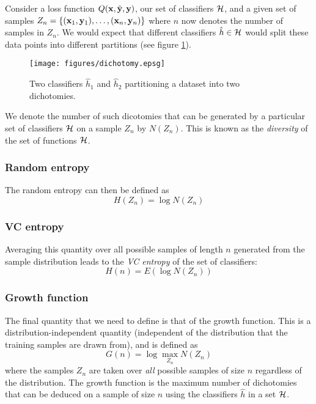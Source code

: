 Consider a loss function $Q(\mathbf{x}, \hat{\mathbf{y}}, \mathbf{y})$, our set of
classifiers $\mathcal{H}$, and a given set of samples $Z_n = \{ (\mathbf{x}_1,
\mathbf{y}_1), \ldots, (\mathbf{x}_n, \mathbf{y}_n) \}$ where $n$ now denotes the number
of samples in $Z_n$.  We would expect that different classifiers
$\hat{h} \in \mathcal{H}$ would split these data points into different
partitions (see figure \ref{fig:dichotomy}).

\begin{figure}
\begin{center}
\texttt{[image: figures/dichotomy.epsg]}
\end{center}
\caption{Two classifiers $\hat{h}_1$ and $\hat{h}_2$ partitioning a
dataset into two dichotomies.}
\label{fig:dichotomy}
\end{figure}

We denote the number of such dicotomies that can be generated by a
particular set of classifiers $\mathcal{H}$ on a sample $Z_n$ by $N(Z_n)$.
This is known as the \emph{diversity} of the set of functions $\mathcal{H}$.

\subsubsection{Random entropy}

The random entropy can then be defined as
%
\begin{equation}
H(Z_n) = \log N(Z_n)
\end{equation}

\subsubsection{VC entropy}

Averaging this quantity over all possible samples of length $n$
generated from the sample distribution leads to the \emph{VC entropy}
of the set of classifiers:
%
\begin{equation}
H(n) = E(\log N(Z_n))
\end{equation}

\subsubsection{Growth function}

The final quantity that we need to define is that of the growth
function.  This is a distribution-independent quantity (independent of
the distribution that the training samples are drawn from), and is
defined as
%
\begin{equation}
G(n) = \log \max_{Z_n} N(Z_n)
\end{equation}
%
where the samples $Z_n$ are taken over \emph{all} possible samples of
size $n$ regardless of the distribution.  The growth function is the
maximum number of dichotomies that can be deduced on a sample of size
$n$ using the classifiers $\hat{h}$ in a set $\mathcal{H}$.


